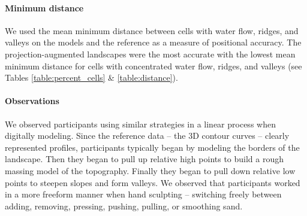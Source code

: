 \documentclass[prodmode,acmtochi]{acmsmall} %
\begin{document}
\paragraph{Minimum distance}
We used
the mean minimum distance between cells
with water flow, ridges, and valleys
on the models and the reference
as a measure of positional accuracy. 
%
The projection-augmented landscapes 
were the most accurate
with the lowest mean minimum distance for cells with
concentrated water flow, ridges, and valleys
(see Tables \ref{table:percent_cells} \& \ref{table:distance}). 

\paragraph{Observations}

% 
%


We observed participants using similar strategies in a linear process 
when digitally modeling. 
Since the reference data -- the 3D contour curves -- 
clearly represented profiles, 
participants typically began by modeling the borders %
of the landscape.
Then they began to pull up relative high points 
to build a rough massing model of the topography.
Finally they began to pull down relative low points to 
steepen slopes and form valleys.
We observed that participants 
worked in a more freeform manner 
when hand sculpting -- switching freely between
adding, removing, pressing, pushing, pulling, or smoothing
sand.
\end{document}
